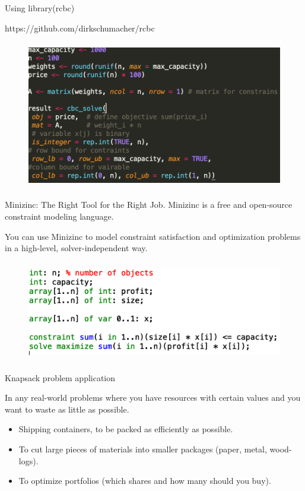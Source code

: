 \documentclass[xcolor=dvipsnames,aspectratio=169]{beamer}
\begin{document}
\begin{frame}{Using library(rcbc)}


https://github.com/dirkschumacher/rcbc

\begin{figure}[t]
  \includegraphics[height =6.5cm]{knapsack.png}

\centering
\end{figure}
\end{frame}



\begin{frame}{Minizinc: The Right Tool for the Right Job.}
Minizinc is a free and open-source constraint modeling language.

You can use Minizinc to model constraint 
satisfaction and optimization problems in a 
high-level, solver-independent way.

    \begin{figure}
    \centering
        \includegraphics[height =4.4cm]{Minizinc_knapsack.png}
    \end{figure}
\end{frame}


\begin{frame}{Knapsack problem application}
    
In any real-world problems where you have resources with certain values
and you want to waste as little as possible.
    \begin{itemize}
        \item Shipping containers, to be packed as efficiently as possible.
        \item To cut large  pieces of materials into smaller packages (paper, metal, wood-logs).
        \item To optimize portfolios (which shares and how 
        many should you buy).

    \end{itemize}

\end{frame}
\end{document}
